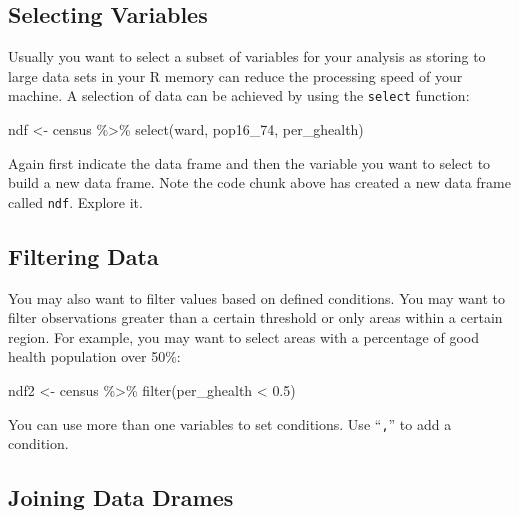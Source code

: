 \documentclass[
]{book}
\newenvironment{Shaded}{\begin{snugshade}}{\end{snugshade}}
\newcommand{\FloatTok}[1]{\textcolor[rgb]{0.00,0.00,0.81}{#1}}
\newcommand{\FunctionTok}[1]{\textcolor[rgb]{0.00,0.00,0.00}{#1}}
\newcommand{\NormalTok}[1]{#1}
\newcommand{\OtherTok}[1]{\textcolor[rgb]{0.56,0.35,0.01}{#1}}
\newcommand{\SpecialCharTok}[1]{\textcolor[rgb]{0.00,0.00,0.00}{#1}}
\begin{document}
\hypertarget{selecting-variables}{%
\subsection{Selecting Variables}\label{selecting-variables}}

Usually you want to select a subset of variables for your analysis as storing to large data sets in your R memory can reduce the processing speed of your machine. A selection of data can be achieved by using the \texttt{select} function:

\begin{Shaded}
\begin{Highlighting}[]
\NormalTok{ndf }\OtherTok{\textless{}{-}}\NormalTok{ census }\SpecialCharTok{\%\textgreater{}\%} \FunctionTok{select}\NormalTok{(ward, pop16\_74, per\_ghealth)}
\end{Highlighting}
\end{Shaded}

Again first indicate the data frame and then the variable you want to select to build a new data frame. Note the code chunk above has created a new data frame called \texttt{ndf}. Explore it.

\hypertarget{filtering-data}{%
\subsection{Filtering Data}\label{filtering-data}}

You may also want to filter values based on defined conditions. You may want to filter observations greater than a certain threshold or only areas within a certain region. For example, you may want to select areas with a percentage of good health population over 50\%:

\begin{Shaded}
\begin{Highlighting}[]
\NormalTok{ndf2 }\OtherTok{\textless{}{-}}\NormalTok{ census }\SpecialCharTok{\%\textgreater{}\%} \FunctionTok{filter}\NormalTok{(per\_ghealth }\SpecialCharTok{\textless{}} \FloatTok{0.5}\NormalTok{)}
\end{Highlighting}
\end{Shaded}

You can use more than one variables to set conditions. Use ``\texttt{,}'' to add a condition.

\hypertarget{joining-data-drames}{%
\subsection{Joining Data Drames}\label{joining-data-drames}}
\end{document}
